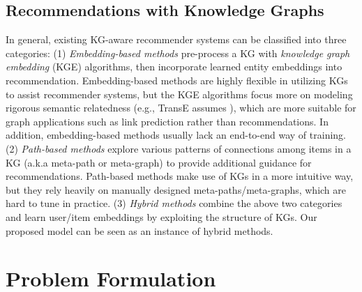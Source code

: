 \documentclass[sigconf]{acmart}
\begin{document}
	\subsection{Recommendations with Knowledge Graphs}
	\label{sec:kg_rs}
		In general, existing KG-aware recommender systems can be classified into three categories:
		(1) \textit{Embedding-based methods} \cite{zhang2016collaborative,wang2018dkn,huang2018improving,wang2019multi} pre-process a KG with \textit{knowledge graph embedding} (KGE) \cite{wang2017knowledge} algorithms, then incorporate learned entity embeddings into recommendation.
		Embedding-based methods are highly flexible in utilizing KGs to assist recommender systems, but the KGE algorithms focus more on modeling rigorous semantic relatedness (e.g., TransE \cite{bordes2013translating} assumes ), which are more suitable for graph applications such as link prediction rather than recommendations.
		In addition, embedding-based methods usually lack an end-to-end way of training.
		(2) \textit{Path-based methods} \cite{yu2014personalized,zhao2017meta,hu2018leveraging} explore various patterns of connections among items in a KG (a.k.a meta-path or meta-graph) to provide additional guidance for recommendations.
		Path-based methods make use of KGs in a more intuitive way, but they rely heavily on manually designed meta-paths/meta-graphs, which are hard to tune in practice.
		(3) \textit{Hybrid methods} \cite{wang2018ripple,sun2018recurrent,wang2019knowledge} combine the above two categories and learn user/item embeddings by exploiting the structure of KGs.
		Our proposed model can be seen as an instance of hybrid methods.
	
	
	
\section{Problem Formulation}
	\label{section:pf}
		
\end{document}
